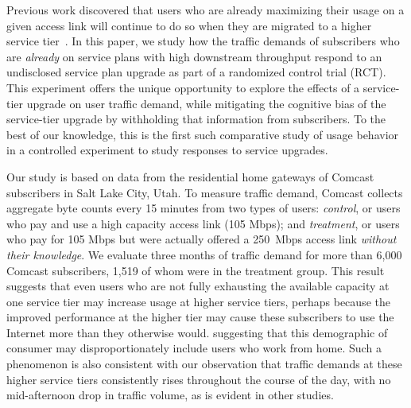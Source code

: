 
Previous work discovered that users who are already maximizing their
usage on a given access link will continue to do so when they are
migrated to a higher service tier~\cite{dasu-imc2014}. In this paper, we
study how the traffic demands of subscribers who are {\em already} on service
plans with high downstream throughput respond to an undisclosed service
plan upgrade as part of a randomized control trial (RCT). This
experiment offers the unique opportunity to explore the effects of a
service-tier upgrade on user traffic demand, while mitigating the
cognitive bias of the service-tier upgrade by withholding that
information from subscribers. To the best of our knowledge, this is the
first such comparative study of usage behavior in a controlled
experiment to study responses to service upgrades.

Our study is based on data from the residential home gateways
of Comcast subscribers in Salt Lake City, Utah. To measure traffic
demand, Comcast collects aggregate byte counts every 15 minutes from two
types of users: {\em control}, or users who pay and use a high capacity
access link (105 Mbps); and {\em treatment}, or users who pay for 105
Mbps but were actually offered a 250~Mbps access link {\em without their
  knowledge}.  We evaluate three months of traffic demand for more than
6,000 Comcast subscribers, 1,519 of whom were in the treatment group.
This result suggests that
 even users who are not fully exhausting the available capacity at
one service tier may increase usage at higher service tiers, perhaps because the
improved performance at the higher tier may cause these subscribers to
use the Internet more than they otherwise would. 
suggesting that this demographic of consumer may disproportionately
include users who work from home.  Such a phenomenon is also consistent
with our observation that traffic demands at these higher service
tiers consistently rises throughout the course of the day, with no
mid-afternoon drop in traffic volume, as is evident in other studies.

